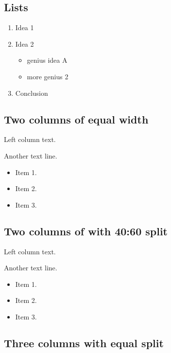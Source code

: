 \documentclass[
  11pt,
]{article}
\providecommand{\tightlist}{%
  \setlength{\itemsep}{0pt}\setlength{\parskip}{0pt}}
\begin{document}
\subsection{Lists}\label{lists}

\begin{enumerate}
\def\labelenumi{\arabic{enumi}.}
\tightlist
\item
  Idea 1
\item
  Idea 2

  \begin{itemize}
  \tightlist
  \item
    genius idea A
  \item
    more genius 2
  \end{itemize}
\item
  Conclusion
\end{enumerate}

\subsection{Two columns of equal
width}\label{two-columns-of-equal-width}

Left column text.

Another text line.

\begin{itemize}
\tightlist
\item
  Item 1.
\item
  Item 2.
\item
  Item 3.
\end{itemize}

\subsection{Two columns of with 40:60
split}\label{two-columns-of-with-4060-split}

Left column text.

Another text line.

\begin{itemize}
\tightlist
\item
  Item 1.
\item
  Item 2.
\item
  Item 3.
\end{itemize}

\subsection{Three columns with equal
split}\label{three-columns-with-equal-split}
\end{document}
